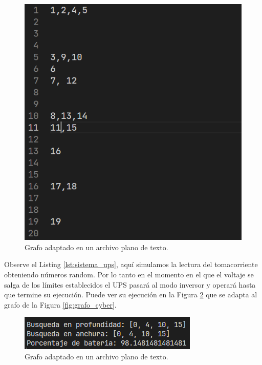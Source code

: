 \documentclass[runningheads]{llncs}
\begin{document}
        \begin{figure}[H]
            \centering
            \includegraphics[width=\textwidth]{grafo_txt}
            \caption{Grafo adaptado en un archivo plano de texto.}
            \label{fig:grafo_txt}
        \end{figure}
        
        Observe el Listing \ref{lst:sistema_ups}, aquí simulamos la lectura del tomacorriente obteniendo números random. Por lo tanto en el momento en el que el voltaje se salga de los límites establecidos el UPS pasará al modo inversor y operará hasta que termine su ejecución. Puede ver su ejecución en la Figura \ref{fig:python_3} que se adapta al grafo de la Figura \ref{fig:grafo_cyber}.
        
        
            
        \begin{figure}[H]
            \centering
            \includegraphics[width=\textwidth]{python_3}
            \caption{Grafo adaptado en un archivo plano de texto.}
            \label{fig:python_3}
        \end{figure}
            
\end{document}
